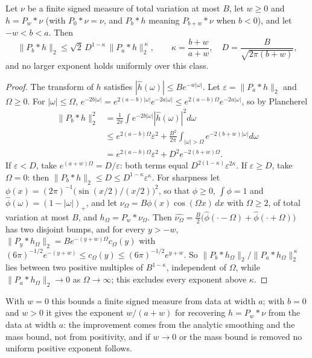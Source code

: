 \begin{proposition}\label{cd:prop:finite}
Let $\nu$ be a finite signed measure of total variation at most $B$, let $w\ge0$ and $h=P_w*\nu$ (with $P_0*\nu=\nu$, and $P_b*h$ meaning $P_{b+w}*\nu$ when $b<0$), and let $-w<b<a$. Then
\[
\|P_b*h\|_2\le\sqrt2\,D^{1-\kappa}\,\|P_a*h\|_2^{\,\kappa},\qquad\kappa=\frac{b+w}{a+w},\quad D=\frac{B}{\sqrt{2\pi(b+w)}} ,
\]
and no larger exponent holds uniformly over this class.
\end{proposition}

\begin{proof}
The transform of $h$ satisfies $|\widehat h(\omega)|\le Be^{-w|\omega|}$. Let $\varepsilon=\|P_a*h\|_2$ and $\Omega\ge0$. For $|\omega|\le\Omega$, $e^{-2b|\omega|}=e^{2(a-b)|\omega|}e^{-2a|\omega|}\le e^{2(a-b)\Omega}e^{-2a|\omega|}$, so by Plancherel
\[
\begin{split}\|P_b*h\|_2^2&=\frac1{2\pi}\int e^{-2b|\omega|}|\widehat h(\omega)|^2d\omega\\&\le e^{2(a-b)\Omega}\varepsilon^2+\frac{B^2}{2\pi}\int_{|\omega|>\Omega}e^{-2(b+w)|\omega|}d\omega\\&=e^{2(a-b)\Omega}\varepsilon^2+D^2e^{-2(b+w)\Omega}.\end{split}
\]
If $\varepsilon<D$, take $e^{(a+w)\Omega}=D/\varepsilon$: both terms equal $D^{2(1-\kappa)}\varepsilon^{2\kappa}$. If $\varepsilon\ge D$, take $\Omega=0$: then $\|P_b*h\|_2\le D\le D^{1-\kappa}\varepsilon^\kappa$. For sharpness let $\phi(x)=(2\pi)^{-1}\bigl(\sin(x/2)/(x/2)\bigr)^2$, so that $\phi\ge0$, $\int\phi=1$ and $\widehat\phi(\omega)=(1-|\omega|)_+$, and let $\nu_\Omega=B\phi(x)\cos(\Omega x)\,dx$ with $\Omega\ge2$, of total variation at most $B$, and $h_\Omega=P_w*\nu_\Omega$. Then $\widehat{\nu_\Omega}=\tfrac B2\bigl(\widehat\phi(\cdot-\Omega)+\widehat\phi(\cdot+\Omega)\bigr)$ has two disjoint bumps, and for every $y>-w$, $\|P_y*h_\Omega\|_2=Be^{-(y+w)\Omega}c_\Omega(y)$ with $(6\pi)^{-1/2}e^{-(y+w)}\le c_\Omega(y)\le(6\pi)^{-1/2}e^{y+w}$. So $\|P_b*h_\Omega\|_2/\|P_a*h_\Omega\|_2^{\,\kappa}$ lies between two positive multiples of $B^{1-\kappa}$, independent of $\Omega$, while $\|P_a*h_\Omega\|_2\to0$ as $\Omega\to\infty$; this excludes every exponent above $\kappa$.
\end{proof}

With $w=0$ this bounds a finite signed measure from data at width $a$; with $b=0$ and $w>0$ it gives the exponent $w/(a+w)$ for recovering $h=P_w*\nu$ from the data at width $a$: the improvement comes from the analytic smoothing and the mass bound, not from positivity, and if $w\to0$ or the mass bound is removed no uniform positive exponent follows.


